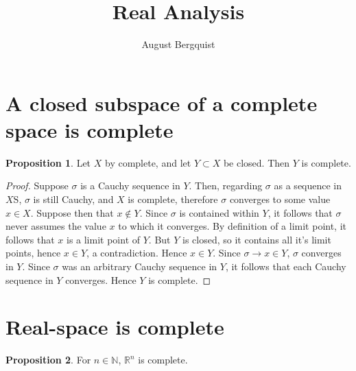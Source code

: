 \documentclass[11pt]{article}
\title{Real Analysis}
\author{August Bergquist}
\newcommand{\R}{\mathbb{R}}
\newcommand{\N}{\mathbb{N}}
\theoremstyle{definition}
\newtheorem{proposition}{Proposition}
\begin{document}
\maketitle

\section{A closed subspace of a complete space is complete}

\begin{proposition}
Let $X$ by complete, and let $Y\subset X$ be closed. Then $Y$ is complete.
\end{proposition}
\begin{proof}
Suppose $\sigma$ is a Cauchy sequence in $Y$. Then, regarding $\sigma$ as a sequence in $X$S, $\sigma$ is still Cauchy, and $X$ is complete, therefore $\sigma$ converges to some value $x\in X$. Suppose then that $x\not\in Y$. Since $\sigma$ is contained within $Y$, it follows that $\sigma$ never assumes the value $x$ to which it converges. By definition of a limit point, it follows that $x$ is a limit point of $Y$. But $Y$ is closed, so it contains all it's limit points, hence $x\in Y$, a contradiction. Hence $x\in Y$. Since $\sigma\to x\in Y$, $\sigma$ converges in $Y$. Since $\sigma$ was an arbitrary Cauchy sequence in $Y$, it follows that each Cauchy sequence in $Y$ converges. Hence $Y$ is complete. 

\end{proof}

\section{Real-space is complete}

\begin{proposition}
For $n\in \N$, $\R^n$ is complete.
\end{proposition}
\end{document}
